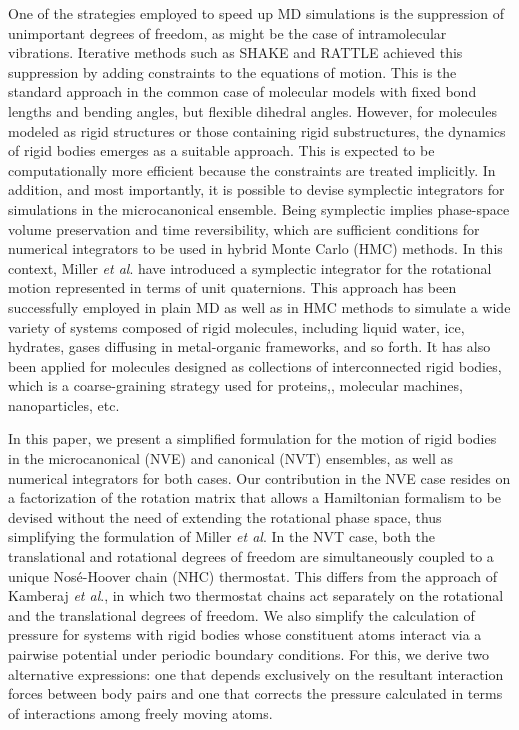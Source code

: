 \documentclass[aip,jcp,reprint,amsmath,amssymb]{revtex4-1}
\begin{document}
One of the strategies employed to speed up MD simulations is the suppression of unimportant degrees of freedom, as might be the case of intramolecular vibrations. Iterative methods such as SHAKE\cite{Ryckaert1977} and RATTLE\cite{Andersen1983} achieved this suppression by adding constraints to the equations of motion. This is the standard approach in the common case of molecular models with fixed bond lengths and bending angles, but flexible dihedral angles. However, for molecules modeled as rigid structures or those containing rigid substructures,\cite{Miller2002} the dynamics of rigid bodies emerges as a suitable approach. This is expected to be computationally more efficient because the constraints are treated implicitly. In addition, and most importantly, it is possible to devise symplectic integrators for simulations in the microcanonical ensemble. Being symplectic implies phase-space volume preservation and time reversibility, which are sufficient conditions for numerical integrators to be used in hybrid Monte Carlo (HMC) methods.\cite{Duane1987} In this context, Miller \textit{et al}.\cite{Miller2002} have introduced a symplectic integrator for the rotational motion represented in terms of unit quaternions. This approach has been successfully employed in plain MD as well as in HMC methods to simulate a wide variety of systems composed of rigid molecules, including liquid water,\cite{Sakamaki2011, Reinhardt2012, Palmer2014, Gonzales2014} ice,\cite{Geiger2014} hydrates,\cite{Tribello2009, Gorman2012} gases diffusing in metal-organic frameworks,\cite{Ghoufi2010} and so forth. It has also been applied for molecules designed as collections of interconnected rigid bodies, which is a coarse-graining strategy used for proteins,\cite{Terada2003}, molecular machines,\cite{Akimov2008, Konyukhov2010} nanoparticles,\cite{Knorowski2012, Patra2013} etc.

In this paper, we present a simplified formulation for the motion of rigid bodies in the microcanonical (NVE) and canonical (NVT) ensembles, as well as numerical integrators for both cases. Our contribution in the NVE case resides on a factorization of the rotation matrix that allows a Hamiltonian formalism to be devised without the need of extending the rotational phase space, thus simplifying the formulation of Miller \textit{et al}.\cite{Miller2002} In the NVT case, both the translational and rotational degrees of freedom are simultaneously coupled to a unique Nos\'e-Hoover chain (NHC) thermostat. This differs from the approach of Kamberaj \textit{et al}.,\cite{Kamberaj2005} in which two thermostat chains act separately on the rotational and the translational degrees of freedom. We also simplify the calculation of pressure for systems with rigid bodies whose constituent atoms interact via a pairwise potential under periodic boundary conditions. For this, we derive two alternative expressions: one that depends exclusively on the resultant interaction forces between body pairs and one that corrects the pressure calculated in terms of interactions among freely moving atoms.
\end{document}
